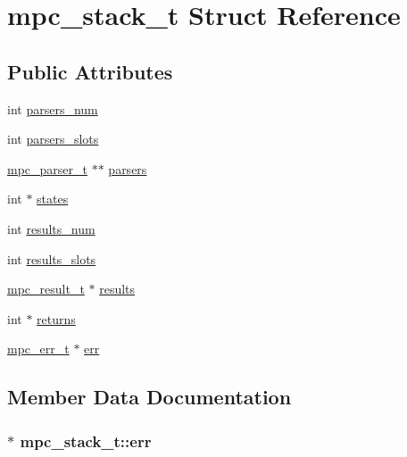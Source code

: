 \hypertarget{structmpc__stack__t}{}\section{mpc\+\_\+stack\+\_\+t Struct Reference}
\label{structmpc__stack__t}
\subsection*{Public Attributes}
\begin{DoxyCompactItemize}
\item 
int \hyperlink{structmpc__stack__t_a354a1ebfa883e4497090d210f3e63819}{parsers\+\_\+num}
\item 
int \hyperlink{structmpc__stack__t_a7a592ce94d9e84f03ebeaebc9dd62e46}{parsers\+\_\+slots}
\item 
\hyperlink{structmpc__parser__t}{mpc\+\_\+parser\+\_\+t} $\ast$$\ast$ \hyperlink{structmpc__stack__t_ac4014ea3a4aada60c338b45117d336be}{parsers}
\item 
int $\ast$ \hyperlink{structmpc__stack__t_a3c22e1d9055caa7e741e2cb209c3a291}{states}
\item 
int \hyperlink{structmpc__stack__t_a3483f5d9b0461e88df7484f2fdabb8b6}{results\+\_\+num}
\item 
int \hyperlink{structmpc__stack__t_ab67a2d3f222c307628c9dc1ab06f68d9}{results\+\_\+slots}
\item 
\hyperlink{unionmpc__result__t}{mpc\+\_\+result\+\_\+t} $\ast$ \hyperlink{structmpc__stack__t_ad2ba24799d5be0a2b31c7b1593a76521}{results}
\item 
int $\ast$ \hyperlink{structmpc__stack__t_a547db90cb6af79ae6c65e1e74c0d16bb}{returns}
\item 
\hyperlink{structmpc__err__t}{mpc\+\_\+err\+\_\+t} $\ast$ \hyperlink{structmpc__stack__t_a20d8a695c42360536a9fc0611446088f}{err}
\end{DoxyCompactItemize}


\subsection{Member Data Documentation}
\hypertarget{structmpc__stack__t_a20d8a695c42360536a9fc0611446088f}{}
\subsubsection[{err}]{$\ast$ mpc\+\_\+stack\+\_\+t\+::err}\label{structmpc__stack__t_a20d8a695c42360536a9fc0611446088f}
\hypertarget{structmpc__stack__t_ac4014ea3a4aada60c338b45117d336be}{}
